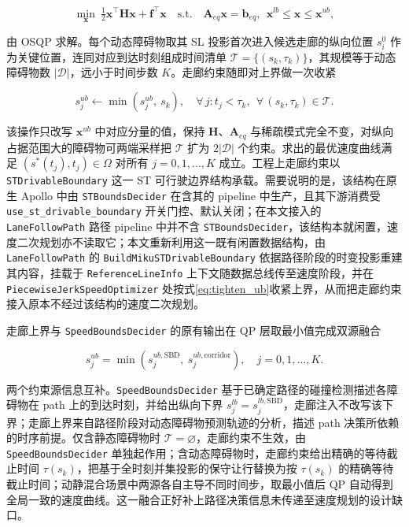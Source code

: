 \documentclass[a4paper,11pt]{ctexart}
\theoremstyle{definition}
\begin{document}
\begin{equation}
    \min_{\mathbf{x}}\ \tfrac{1}{2}\mathbf{x}^{\top}\mathbf{H}\mathbf{x} + \mathbf{f}^{\top}\mathbf{x}
    \quad \text{s.t.}\quad \mathbf{A}_{eq}\mathbf{x} = \mathbf{b}_{eq},\ \ \mathbf{x}^{lb} \leq \mathbf{x} \leq \mathbf{x}^{ub},
    \label{eq:qp_compact}
\end{equation}

由 OSQP 求解。每个动态障碍物取其 SL 投影首次进入候选走廊的纵向位置 $s_i^{0}$ 作为关键位置，连同对应到达时刻组成时间清单 $\mathcal{T} = \{(s_k, \tau_k)\}$，其规模等于动态障碍物数 $|\mathcal{D}|$，远小于时间步数 $K$。走廊约束随即对上界做一次收紧

\begin{equation}
    s_j^{ub} \leftarrow \min\!\left(s_j^{ub},\ s_k\right), \quad \forall\, j: t_j < \tau_k,\ \ \forall\, (s_k, \tau_k) \in \mathcal{T}.
    \label{eq:tighten_ub}
\end{equation}

该操作只改写 $\mathbf{x}^{ub}$ 中对应分量的值，保持 $\mathbf{H}$、$\mathbf{A}_{eq}$ 与稀疏模式完全不变，对纵向占据范围大的障碍物可两端采样把 $\mathcal{T}$ 扩为 $2|\mathcal{D}|$ 个约束。求出的最优速度曲线满足 $(s^{*}(t_j), t_j) \in \Omega$ 对所有 $j=0,1,\ldots,K$ 成立。工程上走廊约束以 \texttt{STDrivableBoundary} 这一 ST 可行驶边界结构承载。需要说明的是，该结构在原生 Apollo 中由 \texttt{STBoundsDecider} 在含其的 pipeline 中生产，且其下游消费受 \texttt{use\_st\_drivable\_boundary} 开关门控、默认关闭；在本文接入的 \texttt{LaneFollowPath} 路径 pipeline 中并不含 \texttt{STBoundsDecider}，该结构本就闲置，速度二次规划亦不读取它；本文重新利用这一既有闲置数据结构，由 \texttt{LaneFollowPath} 的 \texttt{BuildMikuSTDrivableBoundary} 依据路径阶段的时变投影重建其内容，挂载于 \texttt{ReferenceLineInfo} 上下文随数据总线传至速度阶段，并在 \texttt{PiecewiseJerkSpeedOptimizer} 处按式\eqref{eq:tighten_ub}收紧上界，从而把走廊约束接入原本不经过该结构的速度二次规划。

走廊上界与 \texttt{SpeedBoundsDecider} 的原有输出在 QP 层取最小值完成双源融合

\begin{equation}
    s_j^{ub} = \min\!\left(s_j^{ub,\mathrm{SBD}},\ s_j^{ub,\mathrm{corridor}}\right), \quad j = 0,1,\ldots,K.
    \label{eq:dual_source}
\end{equation}

两个约束源信息互补。\texttt{SpeedBoundsDecider} 基于已确定路径的碰撞检测描述各障碍物在 path 上的到达时刻，并给出纵向下界 $s_j^{lb}=s_j^{lb,\mathrm{SBD}}$，走廊注入不改写该下界；走廊上界来自路径阶段对动态障碍物预测轨迹的分析，描述 path 决策所依赖的时序前提。仅含静态障碍物时 $\mathcal{T}=\varnothing$，走廊约束不生效，由 \texttt{SpeedBoundsDecider} 单独起作用；含动态障碍物时，走廊约束给出精确的等待截止时间 $\tau(s_k)$，把基于全时刻并集投影的保守让行替换为按 $\tau(s_k)$ 的精确等待截止时间；动静混合场景中两源各自主导不同时间步，取最小值后 QP 自动得到全局一致的速度曲线。这一融合正好补上路径决策信息未传递至速度规划的设计缺口。
\end{document}
